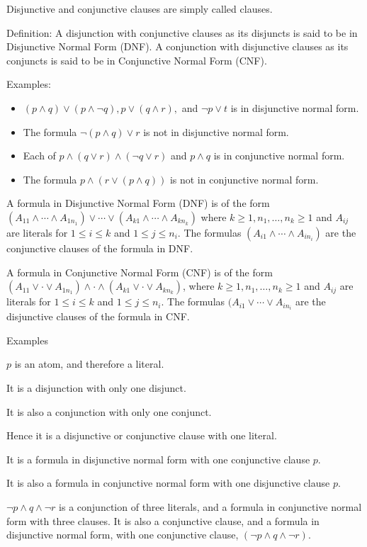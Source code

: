 \documentclass{article}
\begin{document}
Disjunctive and conjunctive clauses are simply called clauses. 

Definition: A disjunction with conjunctive clauses as its disjuncts is said to be in Disjunctive Normal Form (DNF). A conjunction with disjunctive clauses as its conjuncts is said to be in Conjunctive Normal Form (CNF). 

Examples:
\begin{itemize}
    \item $(p \wedge q) \vee (p \wedge \neg q), p \vee (q \wedge r),$ and $\neg p \vee t$ is in disjunctive normal form. 
    \item The formula $\neg (p \wedge q) \vee r$ is not in disjunctive normal form.
    \item Each of $p \wedge (q \vee r) \wedge (\neg q \vee r)$ and $p \wedge q$ is in conjunctive normal form.
    \item The formula $p \wedge (r \vee (p \wedge q))$ is not in conjunctive normal form.
\end{itemize}

A formula in Disjunctive Normal Form (DNF) is of the form $(A_{11} \wedge \cdots \wedge A_{1n_1}) \vee \cdots \vee (A_{k1} \wedge \cdots \wedge A_{kn_k})$ where $k \ge 1, n_1, \ldots, n_k \ge 1$ and $A_{ij}$ are literals for $1 \le i \le k$ and $1 \le j \le n_i$. The formulas $(A_{i1} \wedge \cdots \wedge A_{in_i})$ are the conjunctive clauses of the formula in DNF. 

A formula in Conjunctive Normal Form (CNF) is of the form $(A_{11} \vee \cdot \vee A_{1n_1} ) \wedge \cdot \wedge (A_{k1} \vee \cdot \vee A_{kn_k} )$, where $k \ge 1, n_1, \ldots, n_k \ge 1$ and $A_{ij}$ are literals for $1 \le i \le k$ and $1 \le j \le n_i$. The formulas $(A_{i1} \vee \cdots \vee A_{in_i}$ are the disjunctive clauses of the formula in CNF.

Examples

$p$ is an atom, and therefore a literal.

It is a disjunction with only one disjunct.

It is also a conjunction with only one conjunct.

Hence it is a disjunctive or conjunctive clause with one literal.

It is a formula in disjunctive normal form with one conjunctive clause $p$. 

It is also a formula in conjunctive normal form with one disjunctive clause $p$. 

$\neg p \wedge q \wedge \neg r$ is a conjunction of three literals, and a formula in conjunctive normal form with three clauses. It is also a conjunctive clause, and a formula in disjunctive normal form, with one conjunctive clause, $(\neg p \wedge q \wedge \neg r)$.
\end{document}
